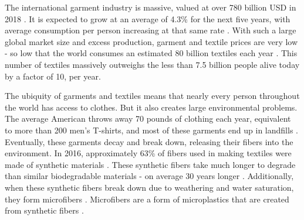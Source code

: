 \documentclass{article}
\begin{document}
The international garment industry is massive, valued at over 780 billion USD in 2018 \autocite{shenglufashion}. It is expected to grow at an average of 4.3\% for the next five years, with average consumption per person increasing at that same rate \autocite{shenglufashion}\autocite{grandviewresearch}. With such a large global market size and excess production, garment and textile prices are very low - so low that the world consumes an estimated 80 billion textiles each year \autocite{shenglufashion}\autocite{grandviewresearch}. This number of textiles massively outweighs the less than 7.5 billion people alive today by a factor of 10, per year\autocite{grandviewresearch}.

The ubiquity of garments and textiles means that nearly every person throughout the world has access to clothes. But it also creates large environmental problems. The average American throws away 70 pounds of clothing each year, equivalent to more than 200 men's T-shirts, and most of these garments end up in landfills \autocite{shenglufashion}\autocite{grandviewresearch}. Eventually, these garments decay and break down, releasing their fibers into the environment. In 2016, approximately 63\% of fibers used in making textiles were made of synthetic materials \autocite{ihsmarkit}. These synthetic fibers take much longer to degrade than similar biodegradable materials - on average 30 years longer \autocite{ihsmarkit}. Additionally, when these synthetic fibers break down due to weathering and water saturation, they form microfibers \autocite{quantifyingfibers}. Microfibers are a form of microplastics that are created from synthetic fibers \autocite{quantifyingfibers}.
\end{document}
